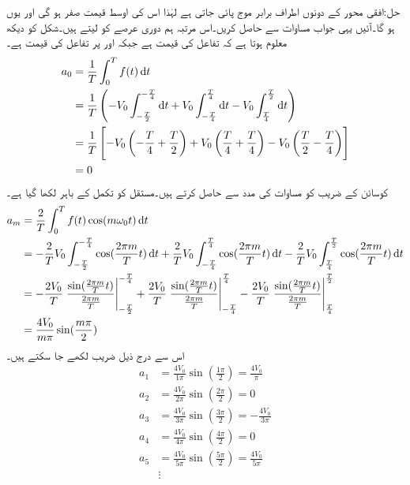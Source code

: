 حل:افقی محور کے دونوں اطراف برابر موج پائی جاتی ہے لہٰذا اس کی اوسط قیمت صفر ہو گی اور یوں  ہو گا۔آئیں یہی جواب مساوات  سے حاصل کریں۔اس مرتبہ ہم دوری عرصے کو  لیتے ہیں۔شکل کو دیکھ معلوم ہوتا ہے کہ  تفاعل کی قیمت  ہے جبکہ
  اور  پر تفاعل کی قیمت  ہے۔
\begin{align*}
a_0&=\frac{1}{T}\int_0^T f(t) \dif t\\
&=\frac{1}{T} \left(-V_0 \int_{-\frac{T}{2}}^{-\frac{T}{4}} \dif t+V_0\int_{-\frac{T}{4}}^{\frac{T}{4}}\dif t -V_0\int_{\frac{T}{4}}^{\frac{T}{2}} \dif t\right)\\
&=\frac{1}{T}\left[-V_0\left(-\frac{T}{4}+\frac{T}{2}\right)+V_0\left(\frac{T}{4}+\frac{T}{4}\right)-V_0\left(\frac{T}{2}-\frac{T}{4}\right)\right]\\
&=0
\end{align*}
کوسائن کے  ضریب   کو مساوات  کی مدد سے حاصل کرتے ہیں۔مستقل  کو تکمل کے باہر لکھا گیا ہے۔
\begin{align*}
a_m&=\frac{2}{T}\int_0^T f(t)\cos(m\omega_0 t) \dif t\\
&=-\frac{2}{T}V_0\int_{-\frac{T}{2}}^{-\frac{T}{4}} \cos (\frac{2\pi m}{T} t) \dif t+\frac{2}{T}V_0\int_{-\frac{T}{4}}^{\frac{T}{4}} \cos (\frac{2\pi m}{T} t) \dif t-\frac{2}{T}V_0\int_{\frac{T}{4}}^{\frac{T}{2}} \cos (\frac{2\pi m}{T} t) \dif t\\
&=-\frac{2V_0}{T}\left.\frac{\sin (\frac{2\pi m}{T} t)}{\frac{2\pi m}{T}}\right|_{-\frac{T}{2}}^{-\frac{T}{4}}+\frac{2V_0}{T}\left.\frac{\sin (\frac{2\pi m}{T} t)}{\frac{2\pi m}{T}}\right|_{-\frac{T}{4}}^{\frac{T}{4}}-\frac{2V_0}{T}\left.\frac{\sin (\frac{2\pi m}{T} t)}{\frac{2\pi m}{T}}\right|_{\frac{T}{4}}^{\frac{T}{2}}\\
&=\frac{4V_0}{m\pi} \sin(\frac{m\pi}{2})
\end{align*}
اس سے درج ذیل  ضریب  لکھے جا سکتے ہیں۔
\begin{align*}
a_1&=\frac{4V_0}{1\pi} \sin(\frac{1\pi}{2})=\frac{4V_0}{\pi}\\
a_2&=\frac{4V_0}{2\pi} \sin(\frac{2\pi}{2})=0\\
a_3&=\frac{4V_0}{3\pi} \sin(\frac{3\pi}{2})=-\frac{4V_0}{3\pi}\\
a_4&=\frac{4V_0}{4\pi} \sin(\frac{4\pi}{2})=0\\
a_5&=\frac{4V_0}{5\pi} \sin(\frac{5\pi}{2})=\frac{4V_0}{5\pi}\\
&\vdots
\end{align*}
